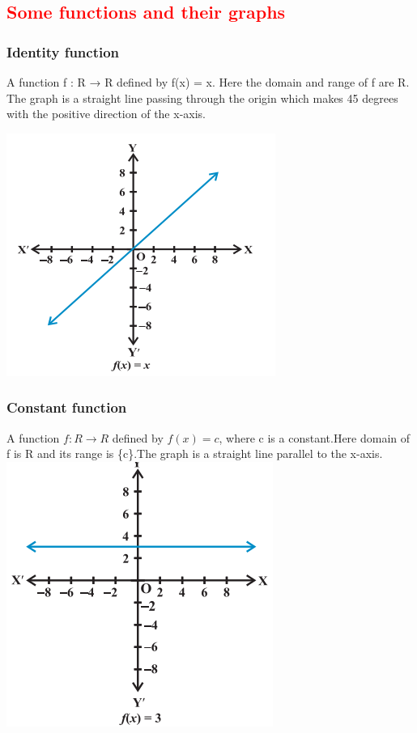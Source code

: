 \documentclass{article}
\begin{document}
\begin{multicols}{2}
\subsection*{\textcolor{red}{Some functions and their graphs}}

\subsubsection*{Identity function}
 A function f : R → R defined by f(x) = x. Here the domain and range of f are R. The graph is a straight line  passing through the origin which makes 45 degrees with the positive direction of the x-axis.

\includegraphics[scale=0.5]{2.png}


\subsubsection*{Constant function}
 A function $f : R \rightarrow R $ defined by $ f(x) = c$, where c is a constant.Here domain of f is R and its range is \{c\}.The graph is a straight line parallel to the x-axis.
\includegraphics[scale=0.5]{3.png}


\end{multicols}
\end{document}
